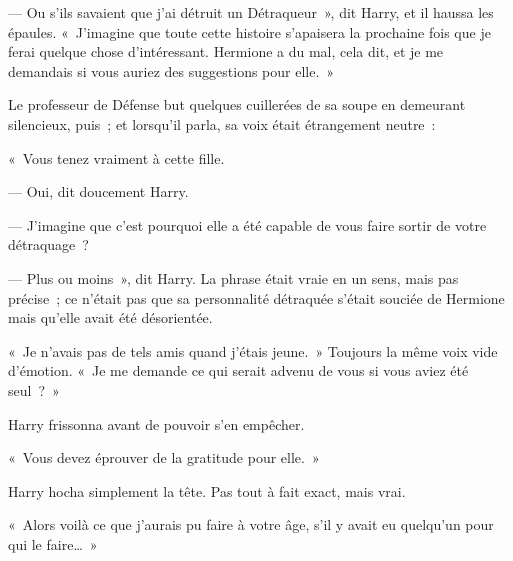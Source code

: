 --- Ou s'ils savaient que j'ai détruit un Détraqueur~», dit Harry, et il haussa les épaules. «~J'imagine que toute cette histoire s'apaisera la prochaine fois que je ferai quelque chose d'intéressant. Hermione a du mal, cela dit, et je me demandais si vous auriez des suggestions pour elle.~»

Le professeur de Défense but quelques cuillerées de sa soupe en demeurant silencieux, puis~; et lorsqu'il parla, sa voix était étrangement neutre~:

«~Vous tenez vraiment à cette fille.

--- Oui, dit doucement Harry.

--- J'imagine que c'est pourquoi elle a été capable de vous faire sortir de votre détraquage~?

--- Plus ou moins~», dit Harry. La phrase était vraie en un sens, mais pas précise~; ce n'était pas que sa personnalité détraquée s'était souciée de Hermione mais qu'elle avait été désorientée.

«~Je n'avais pas de tels amis quand j'étais jeune.~» Toujours la même voix vide d'émotion. «~Je me demande ce qui serait advenu de vous si vous aviez été seul~?~»

Harry frissonna avant de pouvoir s'en empêcher.

«~Vous devez éprouver de la gratitude pour elle.~»

Harry hocha simplement la tête. Pas tout à fait exact, mais vrai.

«~Alors voilà ce que j'aurais pu faire à votre âge, s'il y avait eu quelqu'un pour qui le faire…~»
